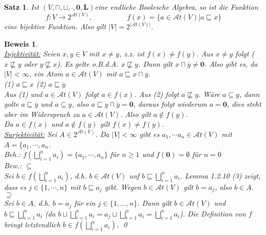 \documentclass[ngerman]{scrartcl}
\theoremstyle{custom}
\newtheorem{ms}[mdef]{Satz}
\newtheorem*{bw}{Beweis}
\newcommand{\0}{\mathbf{0}}
\newcommand{\1}{\mathbf{L}}
\newcommand{\at}{\mathcal{A}t}
\newcommand{\ba}{$(V, \sqcap, \sqcup, \bar~, \0, \1)$}
\begin{document}
\begin{ms}
Ist \ba eine endliche Boolesche Algebra, so ist die Funktion
\begin{equation*}
f: V \rightarrow 2^{\at(V)}, \hspace{2cm} f(x) = \lbrace a \in \at(V) \vert a \sqsubseteq
  x\rbrace
\end{equation*}
eine bijektive Funktion. Also gilt $\vert V \vert = 2^{\vert
    \at(V) \vert}$.
\end{ms}

\begin{bw} ~\\
\underline{Injektivit\"at:} Seien $x,y \in V$ mit $x \not= y$, z.z. ist $f(x) \not=
f(y)$. Aus $x \not= y$ folgt ($x \not \sqsubseteq y$ oder $y \not
\sqsubseteq x$). Es gelte o.B.d.A. $x \not \sqsubseteq y$. Dann gilt
$x \sqcap \overline{y} \not= \0$. Also gibt es, da $\vert V \vert <
\infty$, ein Atom $a \in \at(V)$ mit $a \sqsubseteq x \sqcap
\overline{y}$.\\

(1) $a \sqsubseteq x$ \hspace{3cm}
(2) $a \sqsubseteq \overline{y}$\\

Aus (1) und $a \in \at(V)$ folgt $a \in f(x)$. Aus (2) folgt $a \not
\sqsubseteq y$. W\"are $a \subseteq y$, dann golte $a \sqsubseteq
\overline{y}$ und $a \subseteq y$, also $a \sqsubseteq y \sqcap
\overline{y} = \0$, daraus folgt wiederum $a = \0$, dies steht aber im
Widerspruch zu $a \in \at(V)$. Also gilt $a \notin f(y)$.\\
Da $a \in f(x)$ und $a \notin f(y)$ gilt $f(x) \not= f(y)$.
\\
\underline{Surjektivit\"at:} Sei $A \in 2^{\at(V)}$. Da $\vert V \vert
< \infty$ gibt es $a_1, \cdots a_n \in \at(V)$ mit $A = \{a_1, \cdots,
a_n$.\\
Beh.: $f(\bigsqcup_{i=1}^{n} a_i) = \{a_1, \cdots, a_n\}$ f\"ur $n
\geq 1$ und $f(\0) = \emptyset$ f\"ur $n=0$\\
Bew.: $\subseteq$\\
Sei $b \in f (\bigsqcup_{i=1}^{n} a_i)$, d.h. $b \in \at(V)$ unf $b
\sqsubseteq \bigsqcup_{i=1}^{n} a_i$. Lemma 1.2.10 (3) zeigt, dass es
$j \in \{1, \cdots, n\}$ mit $b \sqsubseteq a_j$ gibt. Wegen $b \in
\at(V)$ gilt $b = a_j$, also $b \in A$.\\
$\supseteq$\\
Sei $b \in A$, d.h. $b = a_j$ f\"ur ein $j \in \{1, \dots, n\}$. Dann
gilt $b \in \at(V)$ und $b \sqsubseteq \bigsqcup_{i=1}^{n} a_i$ (da $b
\sqcup \bigsqcup_{i=1}^{n} a_i = a_j \sqcup \bigsqcup_{i=1}^{n} a_i =
\bigsqcup_{i=1}^{n} a_i$). Die Definition von $f$ bringt letztendlich
$b \in f(\bigsqcup_{i=1}^{n} a_i)$.
\qed
\end{bw}
\end{document}
